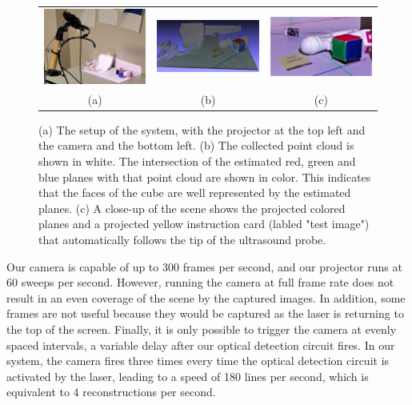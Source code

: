\documentclass{llncs}
\begin{document}
\begin{figure}
\centering
\begin{tabular}{ccc}
\centering
\includegraphics[width=4cm,keepaspectratio]{Final-Setup} &
\includegraphics[width=4cm,keepaspectratio]{Final-Reconstruction} &
\includegraphics[width=4cm,keepaspectratio]{Final-CameraView}\\
(a) & (b) & (c)
\end{tabular}

\caption{
(a) The setup of the system, with the projector at the top left and the camera and the bottom left. (b) The collected point cloud is shown in white. The intersection of the estimated red, green and blue planes with that point cloud are shown in color. This indicates that the faces of the cube are well represented by the estimated planes. (c) A close-up of the scene shows the projected colored planes and a projected yellow instruction card (labled "test image") that automatically follows the tip of the ultrasound probe.
}
\end{figure}

Our camera is capable of up to 300 frames per second, and our projector runs at 60 sweeps per second. However, running the camera at full frame rate does not result in an even coverage of the scene by the captured images. In addition, some frames are not useful because they would be captured as the laser is returning to the top of the screen. Finally, it is only possible to trigger the camera at evenly spaced intervals, a variable delay after our optical detection circuit fires. In our system, the camera fires three times every time the optical detection circuit is activated by the laser, leading to a speed of 180 lines per second, which is equivalent to 4 reconstructions per second.
\end{document}
